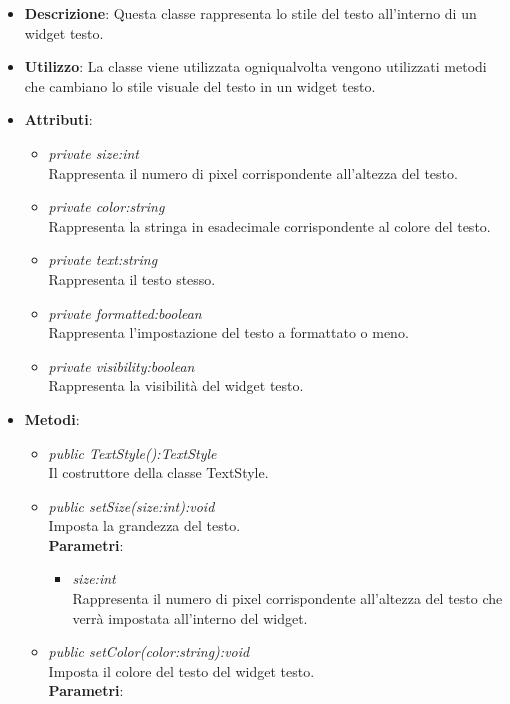 \begin{itemize}
\item \textbf{Descrizione}: Questa classe rappresenta lo stile del testo all'interno di un widget testo.
\item \textbf{Utilizzo}: La classe viene utilizzata ogniqualvolta vengono utilizzati metodi che cambiano lo stile visuale del testo in un widget testo.
\item \textbf{Attributi}:
	\begin{itemize}
	\item \textit{private size:int}\\
	Rappresenta il numero di pixel corrispondente all'altezza del testo.
	\item \textit{private color:string}\\
	Rappresenta la stringa in esadecimale corrispondente al colore del testo.
	\item \textit{private text:string}\\
	Rappresenta il testo stesso. 
	\item \textit{private formatted:boolean}\\
	Rappresenta l'impostazione del testo a formattato o meno.
	\item \textit{private visibility:boolean}\\
	Rappresenta la visibilità del widget testo.
	\end{itemize}
\item \textbf{Metodi}:
	\begin{itemize}
	\item \textit{public TextStyle():TextStyle}\\
	Il costruttore della classe TextStyle.
	\item \textit{public setSize(size:int):void}\\
	Imposta la grandezza del testo.
		\\ \textbf{Parametri}: \begin{itemize}
		\item \textit{size:int}\\
		Rappresenta il numero di pixel corrispondente all'altezza del testo che verrà impostata all'interno del widget.
		\end{itemize} 
	\item \textit{public setColor(color:string):void}\\
	Imposta il colore del testo del widget testo.
		\\ \textbf{Parametri}: \begin{itemize}

\end{itemize}
\end{itemize}
\end{itemize}
